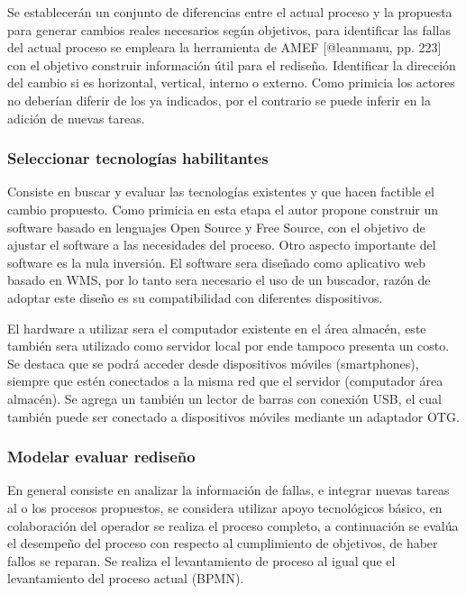 \documentclass[
]{article}
\begin{document}
Se establecerán un conjunto de diferencias entre el actual proceso y la
propuesta para generar cambios reales necesarios según objetivos, para
identificar las fallas del actual proceso se empleara la herramienta de
AMEF {[}@leanmanu, pp. 223{]} con el objetivo construir información útil
para el rediseño. Identificar la dirección del cambio si es horizontal,
vertical, interno o externo. Como primicia los actores no deberían
diferir de los ya indicados, por el contrario se puede inferir en la
adición de nuevas tareas.

\hypertarget{seleccionar-tecnologuxedas-habilitantes}{%
\subsubsection{Seleccionar tecnologías
habilitantes}\label{seleccionar-tecnologuxedas-habilitantes}}

Consiste en buscar y evaluar las tecnologías existentes y que hacen
factible el cambio propuesto. Como primicia en esta etapa el autor
propone construir un software basado en lenguajes Open Source y Free
Source, con el objetivo de ajustar el software a las necesidades del
proceso. Otro aspecto importante del software es la nula inversión. El
software sera diseñado como aplicativo web basado en WMS, por lo tanto
sera necesario el uso de un buscador, razón de adoptar este diseño es su
compatibilidad con diferentes dispositivos.

El hardware a utilizar sera el computador existente en el área almacén,
este también sera utilizado como servidor local por ende tampoco
presenta un costo. Se destaca que se podrá acceder desde dispositivos
móviles (smartphones), siempre que estén conectados a la misma red que
el servidor (computador área almacén). Se agrega un también un lector de
barras con conexión USB, el cual también puede ser conectado a
dispositivos móviles mediante un adaptador OTG.

\hypertarget{modelar-evaluar-rediseuxf1o}{%
\subsubsection{Modelar evaluar
rediseño}\label{modelar-evaluar-rediseuxf1o}}

En general consiste en analizar la información de fallas, e integrar
nuevas tareas al o los procesos propuestos, se considera utilizar apoyo
tecnológicos básico, en colaboración del operador se realiza el proceso
completo, a continuación se evalúa el desempeño del proceso con respecto
al cumplimiento de objetivos, de haber fallos se reparan. Se realiza el
levantamiento de proceso al igual que el levantamiento del proceso
actual (BPMN).
\end{document}
